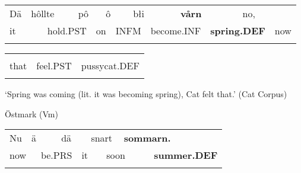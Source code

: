 \begin{tabular}{llllllllllllll}
\lsptoprule
Dä & \multicolumn{2}{l}{hôllte

} & \multicolumn{2}{l}{pô

} & \multicolumn{2}{l}{ô

} & \multicolumn{2}{l}{błi

} & \multicolumn{2}{l}{{\bfseries vårn}

} & \multicolumn{2}{l}{no,

} & \\
\multicolumn{2}{l}{it

} & \multicolumn{2}{l}{hold.PST

} & \multicolumn{2}{l}{on

} & \multicolumn{2}{l}{INFM

} & \multicolumn{2}{l}{become.INF

} & \multicolumn{2}{l}{{\bfseries spring.DEF}

} & \multicolumn{2}{l}{now

}\\
\lspbottomrule
\end{tabular}

\begin{tabular}{lll}
\lsptoprule
\multicolumn{3}{l}{dä

}\\
that & feel.PST & pussycat.DEF\\
\lspbottomrule
\end{tabular}

\begin{styleTranslation}
‘Spring was coming (lit. it was becoming spring), Cat felt that.’ (Cat Corpus)

\end{styleTranslation}

\begin{listWWNumileveli}
\item 

\begin{styleExample}
Östmark (Vm)

\end{styleExample}

\end{listWWNumileveli}

\begin{tabular}{llllllllll}
\lsptoprule
Nu & \multicolumn{2}{l}{ä

} & \multicolumn{2}{l}{dä

} & \multicolumn{2}{l}{snart

} & \multicolumn{2}{l}{{\bfseries sommarn.}

} & \\
\multicolumn{2}{l}{now

} & \multicolumn{2}{l}{be.PRS

} & \multicolumn{2}{l}{it

} & \multicolumn{2}{l}{soon

} & \multicolumn{2}{l}{{\bfseries summer.DEF}

}\\
\lspbottomrule
\end{tabular}


